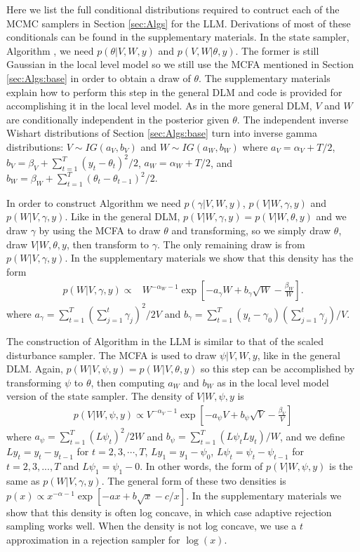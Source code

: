 \documentclass{article}
\begin{document}
Here we list the full conditional distributions required to contruct each of the MCMC samplers in Section \ref{sec:Algs} for the LLM. Derivations of most of these conditionals can be found in the supplementary materials. In the state sampler, Algorithm , we need $p(\theta|V,W,y)$ and $p(V,W|\theta,y)$. The former is still Gaussian in the local level model so we still use the MCFA mentioned in Section \ref{sec:Algs:base} in order to obtain a draw of $\theta$. The supplementary materials explain how to perform this step in the general DLM and code is provided for accomplishing it in the local level model. As in the more general DLM, $V$ and $W$ are conditionally independent in the posterior given $\theta$. The independent inverse Wishart distributions of Section \ref{sec:Algs:base} turn into inverse gamma distributions: $V\sim IG(a_V,b_V)$  and $W\sim IG(a_W, b_W)$ where $a_V = \alpha_V + T/2$, $b_V = \beta_V + \sum_{t=1}^T(y_t - \theta_t)^2/2$, $a_W = \alpha_W + T/2$, and $b_W = \beta_W + \sum_{t=1}^T(\theta_t - \theta_{t-1})^2/2$.

In order to construct Algorithm  we need $p(\gamma|V,W,y)$, $p(V|W,\gamma,y)$ and $p(W|V,\gamma,y)$. Like in the general DLM, $p(V|W,\gamma,y)=p(V|W,\theta,y)$ and we draw $\gamma$ by using the MCFA to draw $\theta$ and transforming, so we simply draw $\theta$, draw $V|W,\theta,y$, then transform to $\gamma$. The only remaining draw is from $p(W|V,\gamma,y)$. In the supplementary materials we show that this density has the form
\begin{align*}
p(W|V,\gamma,y) \propto& W^{-\alpha_W - 1}\exp\left[-a_\gamma W + b_\gamma \sqrt{W} -\frac{\beta_W}{W}\right]. 
\end{align*}
where $a_\gamma =\sum_{t=1}^T(\sum_{j=1}^t\gamma_j)^2/2V$ and $b_\gamma =\sum_{t=1}^T(y_t-\gamma_0)(\sum_{j=1}^t\gamma_j)/V$. 

The construction of Algorithm  in the LLM is similar to that of the scaled disturbance sampler. The MCFA is used to draw $\psi|V,W,y$, like in the general DLM. Again, $p(W|V,\psi,y)=p(W|V,\theta,y)$ so this step can be accomplished by transforming $\psi$ to $\theta$, then computing $a_W$ and $b_W$ as in the local level model version of the state sampler. The density of $V|W,\psi,y$ is
\begin{align*}
 p(V|W,\psi,y) \propto V^{-\alpha_V - 1}\exp\left[ -a_{\psi}V + b_{\psi}\sqrt{V} -\frac{\beta_V}{V}\right] 
\end{align*}
where $a_{\psi}=\sum_{t=1}^T(L\psi_t)^2/2W$ and $b_{\psi}=\sum_{t=1}^T(L\psi_tLy_t)/W$, and we define $Ly_t=y_t-y_{t-1}$ for $t=2,3,\cdots,T$, $Ly_1=y_1 - \psi_0$, $L\psi_t = \psi_t - \psi_{t-1}$ for $t=2,3,...,T$ and $L\psi_1=\psi_1-0$. In other words, the form of $p(V|W,\psi,y)$ is the same as $p(W|V,\gamma,y)$. The general form of these two densities is $p(x)\propto x^{-\alpha-1}\exp\left[ -ax + b\sqrt{x} -c/x\right]$. In the supplementary materials we show that this density is often log concave, in which case adaptive rejection sampling \cite{gilks1992adaptive} works well. When the density is not log concave, we use a $t$ approximation in a rejection sampler for $\log(x)$.
\end{document}
